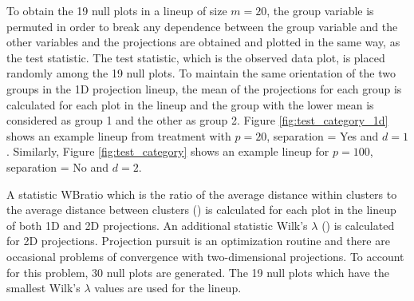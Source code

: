 To obtain the 19 null plots in a lineup of size $m = 20$, the group variable is permuted in order to break any dependence between the group variable and the other variables and the projections are obtained and plotted in the same way, as the test statistic. The test statistic, which is the observed data plot, is placed randomly among the 19 null plots. To maintain the same orientation of the two groups in the 1D projection lineup,  the mean of the projections for each group is calculated for each plot in the lineup and the group with the lower mean is considered as group 1 and the other as group 2. Figure \ref{fig:test_category_1d} shows an example lineup  from treatment with $p = 20$, separation = Yes and $d = 1$. Similarly, Figure \ref{fig:test_category} shows an example lineup for $p =100$, separation = No and $d = 2$.

A statistic WBratio which is the ratio of the average distance within clusters to the average distance between clusters (\cite{hennig:2010}) is calculated for each plot in the lineup of both 1D and 2D projections. An additional statistic Wilk's $\lambda$ (\cite{JW02}) is calculated for 2D projections. Projection pursuit is an optimization routine and there are occasional problems of convergence with two-dimensional projections. To account for this problem, 30 null plots are generated. The 19 null plots which have the smallest Wilk's $\lambda$ values are used for the lineup. 




